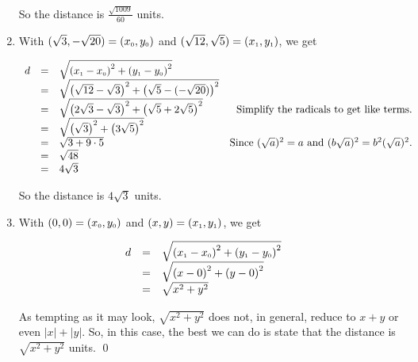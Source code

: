 \documentclass{ximera}
\begin{document}
\begin{example}
\begin{enumerate}
\setlength{\extrarowheight}{2pt}

\medskip

So the distance is $\frac{\sqrt{1009}}{60}$ units.

\item With $(\sqrt{3}, -\sqrt{20}) =  \left(x_{\mbox{\tiny$0$}}, y_{\mbox{\tiny$0$}}\right)$ and  $(\sqrt{12}, \sqrt{5}) = \left(x_{\mbox{\tiny$1$}}, y_{\mbox{\tiny$1$}}\right)$, we get

\setlength{\extrarowheight}{3pt}

\[ \begin{array}{rclr}

 d & = & \sqrt{\left(x_{\mbox{\tiny$1$}} - x_{\mbox{\tiny$0$}} \right)^2 + \left(y_{\mbox{\tiny$1$}} - y_{\mbox{\tiny$0$}} \right)^2} & \\
   & = & \sqrt{ \left(\sqrt{12}- \sqrt{3} \right)^2 + \left(\sqrt{5} - (-\sqrt{20})\right)^2} & \\
   & = & \sqrt{\left(2\sqrt{3} - \sqrt{3} \right)^2 + \left(\sqrt{5}+2\sqrt{5} \right)^2} &  \text{Simplify the radicals to get like terms.}\\
   & = & \sqrt{\left(\sqrt{3}\right)^2 + \left(3 \sqrt{5}\right)^2} &  \\
   & = & \sqrt{3 + 9 \cdot 5} & \text{Since $(\sqrt{a})^2 = a$ and $(b \sqrt{a})^2 = b^2 (\sqrt{a})^2$.} \\
   & = & \sqrt{48} &  \\
   & = & 4\sqrt{3} &  \end{array} \]

\setlength{\extrarowheight}{2pt}

\medskip

So the distance is $4\sqrt{3}$ units.

\item With $(0, 0) =  \left(x_{\mbox{\tiny$0$}}, y_{\mbox{\tiny$0$}}\right)$ and  $(x,y) = \left(x_{\mbox{\tiny$1$}}, y_{\mbox{\tiny$1$}}\right)$, we get

\setlength{\extrarowheight}{3pt}

\[ \begin{array}{rclr}

 d & = & \sqrt{\left(x_{\mbox{\tiny$1$}} - x_{\mbox{\tiny$0$}} \right)^2 + \left(y_{\mbox{\tiny$1$}} - y_{\mbox{\tiny$0$}} \right)^2} & \\
   & = & \sqrt{ \left(x- 0\right)^2 + \left(y - 0\right)^2} & \\
   & = & \sqrt{x^2+y^2} & \end{array} \]

\setlength{\extrarowheight}{2pt}

\medskip

As tempting as it may look, $\sqrt{x^2+y^2}$ does not, in general, reduce to $x + y$ or even $|x| + |y|$.  So, in this case, the best we can do is state that the distance is $\sqrt{x^2+y^2}$ units. \qed


\end{enumerate} 

\end{example}
\end{document}
